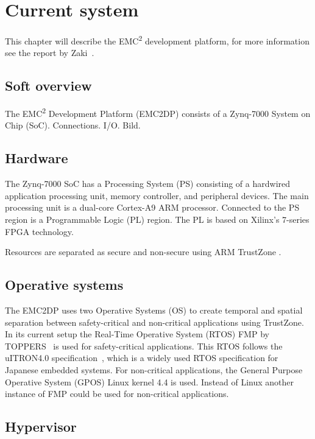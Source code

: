 \chapter{Current system}
\label{sec:lit_emc2mcs}
This chapter will describe the EMC\textsuperscript{2} development platform, for more information see the report by Zaki~\cite{zaki2016}.

\section{Soft overview}
The EMC\textsuperscript{2} Development Platform (EMC2DP) consists of a Zynq-7000 System on Chip (SoC). Connections. I/O. Bild.

\section{Hardware}
The Zynq-7000 SoC has a Processing System (PS) consisting of a hardwired application processing unit, memory controller, and peripheral devices. The main processing unit is a dual-core Cortex-A9 ARM processor. Connected to the PS region is a Programmable Logic (PL) region. The PL is based on Xilinx’s 7-series FPGA technology. 

Resources are separated as secure and non-secure using ARM TrustZone \cite{website:ARM}.\\

\section{Operative systems}
The EMC2DP uses two Operative Systems (OS) to create temporal and spatial separation between safety-critical and non-critical applications using TrustZone. In its current setup the Real-Time Operative System (RTOS) FMP by TOPPERS~\cite{website:fmp} is used for safety-critical applications. This RTOS follows the uITRON4.0 specification~\cite{uitron}, which is a widely used RTOS specification for Japanese embedded systems. For non-critical applications, the General Purpose Operative System (GPOS) Linux kernel 4.4 is used. Instead of Linux another instance of FMP could be used for non-critical applications.\\

\section{Hypervisor}

